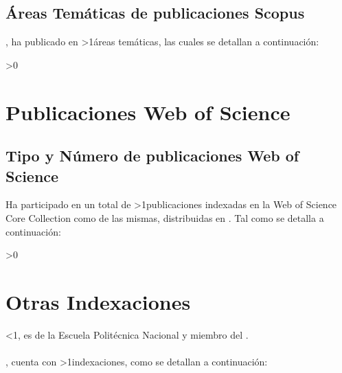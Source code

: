 \documentclass[fleqn,10pt]{wlscirep}
\begin{document}
{\subsection*{Áreas Temáticas de publicaciones Scopus \ifnum{}\fi \docente}
\vspace{1mm}
\ifnum{}\fi \docente, ha publicado en \numAreasTematicas \ifnum\numAreasTematicas>1{áreas temáticas, las cuales se detallan }\fi a continuación:
\begin{enumerate}
\areasTematicasITEM
\end{enumerate}
}\fi


\ifnum\numpublicacionesWos>0{
\vspace{3mm}
\section*{Publicaciones Web of Science}
\subsection*{Tipo y Número de publicaciones Web of Science \ifnum{}\fi \docente}
\vspace{1mm}
Ha  participado  en  un  total  de \numpublicacionesWos \ifnum\numpublicacionesWos>1{publicaciones indexadas en la Web of Science Core Collection como \ifnum{}\fi de las mismas, distribuidas en \distribucionArticulosWos}\fi. Tal como se detalla a continuación:
\begin{enumerate}
\detalleWos
\end{enumerate}
\vspace{2mm}
\ifnum{}\fi
}\fi


\ifnum\numpublicacionesregionales>0{
\section*{Otras Indexaciones}
\ifnum\numpublicacionesscopus<1{\ifnum{}\fi \docente, es \cargo  de la Escuela Politécnica Nacional y miembro del \departamento. \\\\}\fi
\ifnum{}\fi \docente, cuenta con \numpublicacionesregionales \ifnum\numpublicacionesregionales>1{indexaciones, como se detallan a continuación}\fi:
\begin{enumerate}
\detalleRegionales
\end{enumerate}
\vspace{0mm}
}\fi
\ifnum{}\fi
\end{document}

